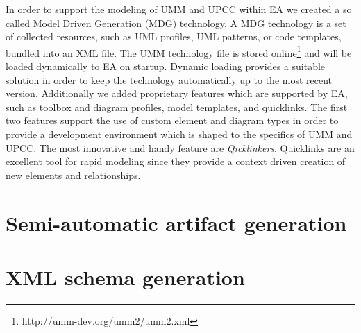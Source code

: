 \documentclass{acm_proc_article-sp}
\begin{document}
In order to support the modeling of UMM and UPCC within EA we created a so called Model Driven Generation (MDG) technology. A MDG technology is a set of collected resources, such as UML profiles, UML patterns, or code templates, bundled into an XML file. The UMM technology file is stored online\footnote{http://umm-dev.org/umm2/umm2.xml} and will be loaded dynamically to EA on startup. Dynamic loading provides a suitable solution in order to keep the technology automatically up to the most recent version. Additionally we added proprietary features which are supported by EA, such as toolbox and diagram profiles, model templates, and quicklinks. The first two features support the use of custom element and diagram types in order to provide a development environment which is shaped to the specifics of UMM and UPCC. The most innovative and handy feature are \textit{Qicklinkers}. Quicklinks are an excellent tool for rapid modeling since they provide a context driven creation of new elements and relationships. 

\section{Semi-automatic artifact generation}

\section{XML schema generation}





  
\end{document}
